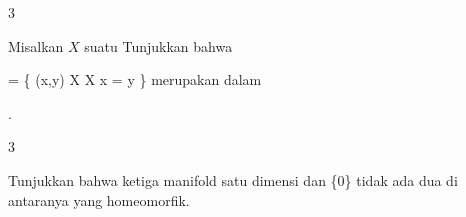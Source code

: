 {3}
{

Misalkan $X$ suatu
Tunjukkan bahwa

\mavergleichskettedisp
{\vergleichskette
{ \triangle
}
{ =} { \left\{ (x,y) \in X \times X  \mid   x = y        \right\}
}
{ } {
}
{ } {
}
{ } {
}
}
{}{}{}
merupakan
dalam

.

}
{} {}

{3}
{

Tunjukkan bahwa ketiga manifold satu dimensi
 {} {\R} {dan} {\R \setminus \{0\}} {}
tidak ada dua di antaranya yang homeomorfik.

}
{} {}

